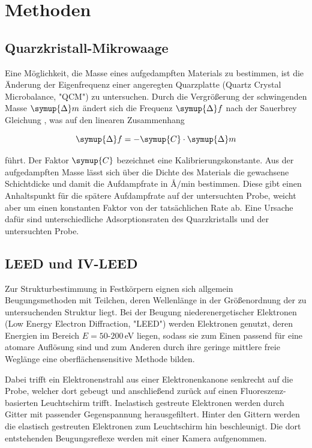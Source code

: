 \chapter{Methoden}

\section{Quarzkristall-Mikrowaage}
Eine Möglichkeit, die Masse  eines aufgedampften Materials
zu bestimmen, ist die Änderung der Eigenfrequenz 
einer angeregten Quarzplatte (Quartz Crystal Microbalance, "QCM") zu untersuchen.
Durch die Vergrößerung der schwingenden Masse $\symup{\Delta}m$ ändert sich die Frequenz $\symup{\Delta}f$ nach der Sauerbrey Gleichung \cite{sauerbrey1959verwendung},
was auf den linearen Zusammenhang

\begin{equation}
        \symup{\Delta}f = -\symup{C} \cdot \symup{\Delta}m
\end{equation}

führt. Der Faktor $\symup{C}$ bezeichnet eine Kalibrierungskonstante. Aus der aufgedampften Masse lässt sich über die Dichte des Materials 
die gewachsene Schichtdicke und damit die Aufdampfrate in $\si{\angstrom\per\minute}$ bestimmen.
Diese gibt einen Anhaltspunkt für die spätere Aufdampfrate auf der untersuchten Probe, 
weicht aber um einen konstanten Faktor von der tatsächlichen Rate ab. 
Eine Ursache dafür sind unterschiedliche Adsorptionsraten des Quarzkristalls und der untersuchten Probe.




\section{LEED und IV-LEED}

Zur Strukturbestimmung in Festkörpern eignen sich allgemein Beugungsmethoden mit Teilchen, deren Wellenlänge in der Größenordnung der 
zu untersuchenden Struktur liegt. Bei der Beugung niederenergetischer Elektronen (Low Energy Electron Diffraction, "LEED") werden Elektronen 
genutzt, deren Energien im Bereich $E=50$-$200$\,eV liegen, sodass sie zum Einen passend für eine atomare Auflösung sind und zum Anderen durch ihre geringe mittlere freie Weglänge 
eine oberflächensensitive Methode bilden. 

Dabei trifft ein Elektronenstrahl aus einer Elektronenkanone senkrecht auf die Probe, welcher dort gebeugt und anschließend 
zurück auf einen  Fluoreszenz-basierten Leuchtschirm trifft. 
Inelastisch gestreute Elektronen werden durch Gitter mit passender Gegenspannung herausgefiltert.
Hinter den Gittern werden die elastisch gestreuten Elektronen zum Leuchtschirm hin beschleunigt.
Die dort entstehenden Beugungsreflexe werden mit einer Kamera aufgenommen.

